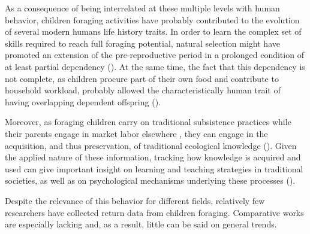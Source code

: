 As a consequence of being interrelated at these multiple levels with human behavior, children foraging activities have probably contributed to the evolution of several modern humans life history traits. In order to learn the complex set of skills required to reach full foraging potential, natural selection might have promoted an extension of the pre-reproductive period in a prolonged condition of at least partial dependency (\cite{kaplan_theory_2000}).
At the same time, the fact that this dependency is not complete, as children procure part of their own food and contribute to household workload, probably allowed the characteristically human trait of having overlapping dependent offspring (\cite{kramer_childrens_2005}).

Moreover, as foraging children carry on traditional subsistence practices while their parents engage in market labor elsewhere ,
they can engage in the acquisition, and thus preservation, of traditional ecological knowledge (\cite{setalaphruk_childrens_2007}).
Given the applied nature of these information, tracking how knowledge is acquired and used can give important insight on learning and teaching strategies in traditional societies, as well as on psychological mechanisms underlying these processes (\cite{lew-levy_who_2019}).







Despite the relevance of this behavior for different fields, relatively few researchers have collected return data from children foraging. Comparative works are especially lacking and, as a result, little can be said on general trends. 

